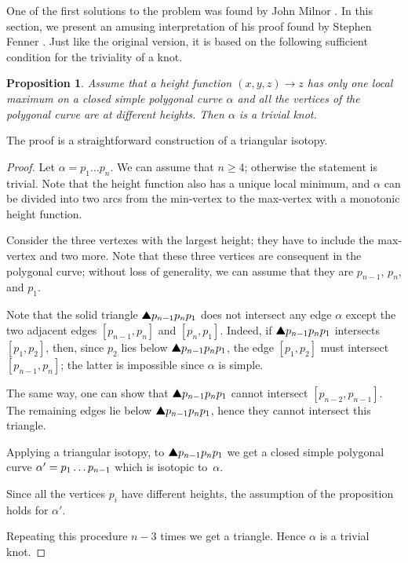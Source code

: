 \documentclass{article}
\newcommand*{\z}[1]{#1\nobreak\discretionary{}%
            {\hbox{$\mathsurround=0pt #1$}}{}}
\theoremstyle{theorem}
\newtheorem{Proposition}[theorem]{Proposition}
\newtheorem{Crofton-type formula}[theorem]{Crofton-type formula}
\newtheorem{Douglas--Rado theorem}[theorem]{Douglas--Rado theorem}
\newtheorem{Extended monotonicity theorem}[theorem]{Extended monotonicity theorem}
\theoremstyle{definition}
\def\solidtriangle{\text{\ding{115}}}
\begin{document}
One of the first solutions to the problem was found by John Milnor \cite{milnor}.
In this section, we present an amusing interpretation of his proof found by Stephen Fenner \cite{ferner}.
Just like the original version, it is based on the following sufficient condition for the triviality of a knot.

\begin{Proposition}\label{prop:one-max-one-min}
Assume that a height function $(x,y,z)\to z$ 
has only one local maximum on a closed simple polygonal curve $\alpha$ and all the vertices of the polygonal curve are at different heights.
Then $\alpha$ is a trivial knot.
\end{Proposition}

The proof is a straightforward construction of a triangular isotopy. 

\begin{proof}
Let $\alpha=p_1\dots p_n$.
We can assume that $n\ge 4$; otherwise the statement is trivial.
Note that the height function also has a unique local minimum, and $\alpha$ can be divided into two arcs from the min-vertex to the max-vertex with a monotonic height function.

Consider the three vertexes with the largest height;
they have to include the max-vertex and two more.
Note that these three vertices are consequent in the polygonal curve; 
without loss of generality, we can assume that they are $p_{n-1}$, $p_n$, and $p_1$.

Note that the solid triangle $\solidtriangle p_{n-1}p_np_1$ does not intersect any edge $\alpha$ except the two adjacent edges $[p_{n-1},p_n]$ and $[p_n,p_1]$.
Indeed, if $\solidtriangle p_{n-1}p_np_1$ intersects $[p_1,p_2]$,
then, 
since $p_2$ lies below $\solidtriangle p_{n-1}p_np_1$,
the edge $[p_1,p_2]$ must intersect $[p_{n-1},p_n]$;
the latter is impossible since $\alpha$ is simple.

The same way, one can show that $\solidtriangle p_{n-1}p_np_1$ cannot intersect $[p_{n-2},p_{n-1}]$.
The remaining edges lie below $\solidtriangle p_{n-1}p_np_1$, hence they cannot intersect this triangle.

Applying a triangular isotopy, to $\solidtriangle p_{n-1}p_np_1$ we get a closed simple polygonal curve $\alpha'\z=p_1\dots p_{n-1}$ which is isotopic to~$\alpha$.

Since all the vertices $p_i$ have different heights,
the assumption of the proposition holds for $\alpha'$.

Repeating this procedure $n-3$ times we get a triangle.
Hence $\alpha$ is a trivial knot.
\end{proof}
\end{document}

